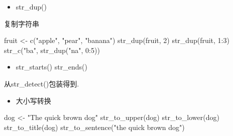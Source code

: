 \documentclass[
]{book}
\newenvironment{Shaded}{\begin{snugshade}}{\end{snugshade}}
\newcommand{\DecValTok}[1]{\textcolor[rgb]{0.00,0.00,0.81}{#1}}
\newcommand{\FunctionTok}[1]{\textcolor[rgb]{0.00,0.00,0.00}{#1}}
\newcommand{\NormalTok}[1]{#1}
\newcommand{\OtherTok}[1]{\textcolor[rgb]{0.56,0.35,0.01}{#1}}
\newcommand{\SpecialCharTok}[1]{\textcolor[rgb]{0.00,0.00,0.00}{#1}}
\newcommand{\StringTok}[1]{\textcolor[rgb]{0.31,0.60,0.02}{#1}}
\providecommand{\tightlist}{%
  \setlength{\itemsep}{0pt}\setlength{\parskip}{0pt}}
\begin{document}
\begin{itemize}
\tightlist
\item
  str\_dup()
\end{itemize}

复制字符串

\begin{Shaded}
\begin{Highlighting}[]
\NormalTok{fruit }\OtherTok{\textless{}{-}} \FunctionTok{c}\NormalTok{(}\StringTok{"apple"}\NormalTok{, }\StringTok{"pear"}\NormalTok{, }\StringTok{"banana"}\NormalTok{)}
\FunctionTok{str\_dup}\NormalTok{(fruit, }\DecValTok{2}\NormalTok{)}
\FunctionTok{str\_dup}\NormalTok{(fruit, }\DecValTok{1}\SpecialCharTok{:}\DecValTok{3}\NormalTok{)}
\FunctionTok{str\_c}\NormalTok{(}\StringTok{"ba"}\NormalTok{, }\FunctionTok{str\_dup}\NormalTok{(}\StringTok{"na"}\NormalTok{, }\DecValTok{0}\SpecialCharTok{:}\DecValTok{5}\NormalTok{))}
\end{Highlighting}
\end{Shaded}

\begin{itemize}
\tightlist
\item
  str\_starts() str\_ends()
\end{itemize}

从str\_detect()包装得到.

\begin{Shaded}
\end{Shaded}

\begin{itemize}
\tightlist
\item
  大小写转换
\end{itemize}

\begin{Shaded}
\begin{Highlighting}[]
\NormalTok{dog }\OtherTok{\textless{}{-}} \StringTok{"The quick brown dog"}
\FunctionTok{str\_to\_upper}\NormalTok{(dog)}
\FunctionTok{str\_to\_lower}\NormalTok{(dog)}
\FunctionTok{str\_to\_title}\NormalTok{(dog)}
\FunctionTok{str\_to\_sentence}\NormalTok{(}\StringTok{"the quick brown dog"}\NormalTok{)}
\end{Highlighting}
\end{Shaded}
\end{document}
